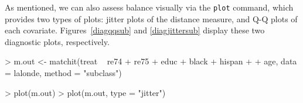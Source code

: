\documentclass[oneside,letterpaper,titlepage]{article}
\begin{document}
\begin{enumerate}
As mentioned, we can also assess balance visually via the \texttt{plot} command, which provides two types of plots: jitter plots of
the distance measure, and Q-Q plots of each covariate.
Figures~\ref{diagqqsub} and \ref{diagjittersub} display these two
diagnostic plots, respectively.

\begin{Schunk}
\begin{Sinput}
> m.out <- matchit(treat ~ re74 + re75 + educ + black + hispan + 
+     age, data = lalonde, method = "subclass")
\end{Sinput}
\end{Schunk}
\begin{Schunk}
\begin{Sinput}
> plot(m.out)
> plot(m.out, type = "jitter")
\end{Sinput}
\end{Schunk}



\end{enumerate}
\end{document}
